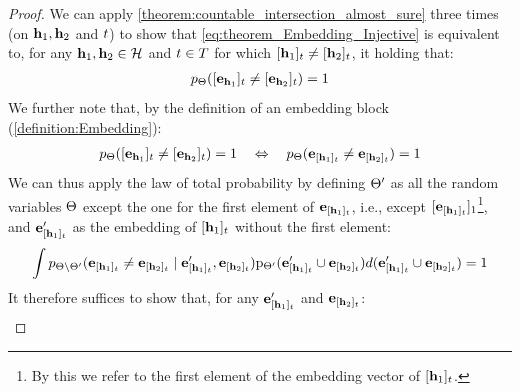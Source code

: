 \EmbeddingInjective*
\begin{proof}
    We can apply \cref{theorem:countable_intersection_almost_sure} three times (on $\mathbf{h}_1,\mathbf{h}_2$ and $t$) to show that \cref{eq:theorem_Embedding_Injective} is equivalent to, for any $\mathbf{h}_1,\mathbf{h}_2\in\mathcal{H}$ and $t\in T$ for which $[\mathbf{h}_1]_t\neq[\mathbf{h}_2]_t$, it holding that:
    \begin{align}
        p_{\Theta}( [\mathbf{e}_{\mathbf{h}_1}]_t\neq[\mathbf{e}_{\mathbf{h}_2}]_t)=1\label{eq:transformer_injective_MLP_0}
    \end{align}
    We further note that, by the definition of an embedding block (\cref{definition:Embedding}):
    \begin{align}
        p_{\Theta}( [\mathbf{e}_{\mathbf{h}_1}]_t\neq[\mathbf{e}_{\mathbf{h}_2}]_t) = 1 \quad 
        \Leftrightarrow \quad 
        p_{\Theta}( \mathbf{e}_{[\mathbf{h}_1]_t}\neq\mathbf{e}_{[\mathbf{h}_2]_t}) = 1
    \end{align}
    We can thus apply the law of total probability by defining $\Theta'$ as all the random variables $\Theta$ except the one for the first element of $\mathbf{e}_{[\mathbf{h}_1]_{t}}$, i.e., except $[\mathbf{e}_{[\mathbf{h}_1]_{t}}]_{1}$\footnote{By this we refer to the first element of the embedding vector of $[\mathbf{h}_1]_{t}$.}, and $\mathbf{e}_{[\mathbf{h}_1]_t}'$ as the embedding of $[\mathbf{h}_1]_t$ without the first element:
    \begin{align}
        \int p_{\Theta\setminus\Theta'}(\mathbf{e}_{[\mathbf{h}_1]_t}\neq\mathbf{e}_{[\mathbf{h}_2]_t}\mid \mathbf{e}_{[\mathbf{h}_1]_t}',\mathbf{e}_{[\mathbf{h}_2]_t})\mathrm{p}_{\Theta'}(\mathbf{e}_{[\mathbf{h}_1]_t}'\cup\mathbf{e}_{[\mathbf{h}_2]_t})d(\mathbf{e}_{[\mathbf{h}_1]_t}'\cup\mathbf{e}_{[\mathbf{h}_2]_t})=1
    \end{align}
    It therefore suffices to show that, for any $\mathbf{e}_{[\mathbf{h}_1]_t}'$ and $\mathbf{e}_{[\mathbf{h}_2]_t}$:
    \begin{align}

\end{align}
\end{proof}
